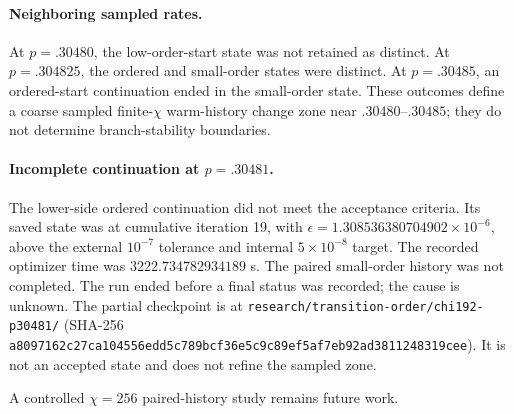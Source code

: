 \documentclass[aps,prx,onecolumn,nofootinbib]{revtex4-2}
\begin{document}
\paragraph{Neighboring sampled rates.} At $p=.30480$, the low-order-start state was not retained as distinct. At $p=.304825$, the ordered and small-order states were distinct. At $p=.30485$, an ordered-start continuation ended in the small-order state. These outcomes define a coarse sampled finite-$\chi$ warm-history change zone near $.30480$--$.30485$; they do not determine branch-stability boundaries.

\paragraph{Incomplete continuation at $p=.30481$.} The lower-side ordered continuation did not meet the acceptance criteria. Its saved state was at cumulative iteration 19, with $\epsilon=1.308536380704902\times10^{-6}$, above the external $10^{-7}$ tolerance and internal $5\times10^{-8}$ target. The recorded optimizer time was $3222.734782934189$ s. The paired small-order history was not completed. The run ended before a final status was recorded; the cause is unknown. The partial checkpoint is at \texttt{research/transition-order/chi192-p30481/} (SHA-256 \texttt{a8097162c27ca104556edd5c789bcf36e5c9c89ef5af7eb92ad3811248319cee}). It is not an accepted state and does not refine the sampled zone.

A controlled $\chi=256$ paired-history study remains future work.
\end{document}
